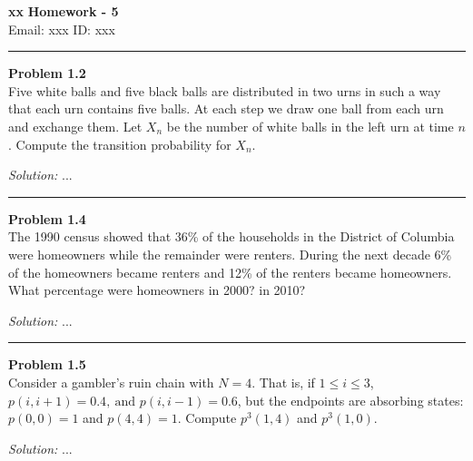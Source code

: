 \documentclass[a4paper, 11pt]{article}
\newenvironment{problem}[2][Problem]
    { \begin{mdframed}[backgroundcolor=gray!20] \textbf{#1 #2} \\}
    {  \end{mdframed}}
\newenvironment{solution}
    {\textit{Solution:}}
    {}
\begin{document}
\noindent
\large\textbf{xx} \hfill \textbf{Homework - 5}   \\
Email: xxx \hfill ID: xxx \\
\noindent\rule{7in}{2.8pt}
\begin{problem}{1.2}
Five white balls and five black balls are distributed in two urns in such a
way that each urn contains five balls. At each step we draw one ball from each
urn and exchange them. Let $X_n$ be the number of white balls in the left urn at
time $n$. Compute the transition probability for $X_n$.
\end{problem}
\begin{solution}
...
\end{solution}

\noindent\rule{7in}{2.8pt}
\begin{problem}{1.4}
The 1990 census showed that 36\% of the households in the District of
Columbia were homeowners while the remainder were renters. During the next
decade 6\% of the homeowners became renters and 12\% of the renters became
homeowners. What percentage were homeowners in 2000? in 2010?
\end{problem}
\begin{solution}
...
\end{solution}

\noindent\rule{7in}{2.8pt}
\begin{problem}{1.5}
Consider a gambler’s ruin chain with $N = 4$. That is, if $1\le i \le3$, $p(i, i + 1) = 0.4,\ \text{and } p(i, i - 1) = 0.6$, but the endpoints are absorbing states:
$p(0, 0) = 1$ and $p(4, 4) = 1$. Compute $p^3(1, 4)$ and $p^3(1, 0)$.
\end{problem}
\begin{solution}
...
\end{solution}
\end{document}
